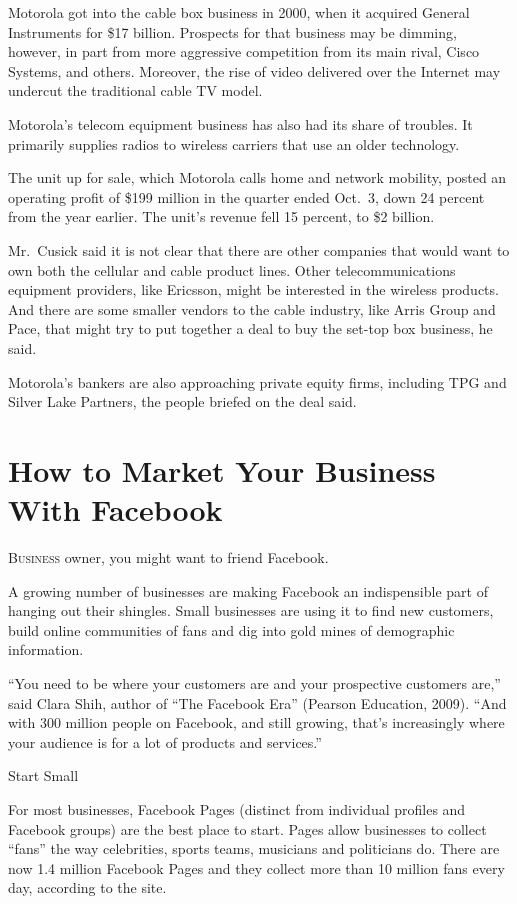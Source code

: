 ﻿\documentclass[12pt]{article}
\begin{document}
Motorola got into the cable box business in 2000, when it acquired General Instruments for \$17
billion. Prospects for that business may be dimming, however, in part from more aggressive
competition from its main rival, Cisco Systems, and others. Moreover, the rise of video delivered
over the Internet may undercut the traditional cable TV model.

Motorola's telecom equipment business has also had its share of troubles. It primarily supplies
radios to wireless carriers that use an older technology.

The unit up for sale, which Motorola calls home and network mobility, posted an operating profit of
\$199 million in the quarter ended Oct.~3, down 24 percent from the year earlier. The unit's revenue
fell 15 percent, to \$2 billion.

Mr.~Cusick said it is not clear that there are other companies that would want to own both the
cellular and cable product lines. Other telecommunications equipment providers, like Ericsson, might
be interested in the wireless products. And there are some smaller vendors to the cable industry,
like Arris Group and Pace, that might try to put together a deal to buy the set-top box business, he
said.

Motorola's bankers are also approaching private equity firms, including TPG and Silver Lake
Partners, the people briefed on the deal said.

\section{How to Market Your Business With Facebook}

\lettrine{B}{usiness} owner, you might want to friend Facebook.

A growing number of businesses are making Facebook an indispensible part of hanging out their
shingles. Small businesses are using it to find new customers, build online communities of fans and
dig into gold mines of demographic information.

``You need to be where your customers are and your prospective customers are,'' said Clara Shih,
author of ``The Facebook Era'' (Pearson Education, 2009). ``And with 300 million people on Facebook,
and still growing, that's increasingly where your audience is for a lot of products and services.''

Start Small

For most businesses, Facebook Pages (distinct from individual profiles and Facebook groups) are the
best place to start. Pages allow businesses to collect ``fans'' the way celebrities, sports teams,
musicians and politicians do. There are now 1.4 million Facebook Pages and they collect more than 10
million fans every day, according to the site.
\end{document}
